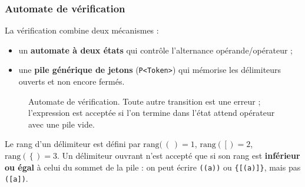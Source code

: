 \documentclass[11pt,a4paper]{article}
\newcommand{\code}[1]{\texttt{#1}}
\begin{document}
\subsubsection{Automate de vérification}

La vérification combine deux mécanismes :
\begin{itemize}
  \item un \textbf{automate à deux états} qui contrôle l'alternance
        opérande/opérateur ;
  \item une \textbf{pile générique de jetons} (\code{P<Token>}) qui mémorise
        les délimiteurs ouverts et non encore fermés.
\end{itemize}

\begin{figure}[H]
\centering
{}
\caption{Automate de vérification. Toute autre transition est une erreur ;
l'expression est acceptée si l'on termine dans l'état \og attend opérateur \fg{}
avec une pile vide.}
\end{figure}

Le rang d'un délimiteur est défini par $\text{rang}(\,(\,)=1$,
$\text{rang}(\,[\,)=2$, $\text{rang}(\,\{\,)=3$. Un délimiteur ouvrant
n'est accepté que si son rang est \textbf{inférieur ou égal} à celui du
sommet de la pile : on peut écrire \code{((a))} ou \code{\{[(a)]\}}, mais
pas \code{([a])}.
\end{document}
